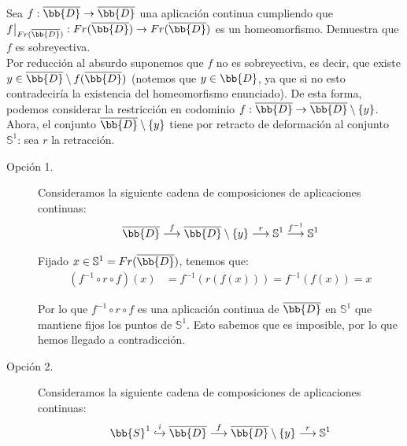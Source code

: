 \documentclass[12pt]{article}
\begin{document}
    \begin{ejercicio} %
        Sea $f:\overline{\bb{D}}\to \overline{\bb{D}}$ una aplicación continua cumpliendo que $f\big|_{Fr(\overline{\bb{D}})}:Fr(\overline{\bb{D}})\to Fr(\overline{\bb{D}})$ es un homeomorfismo. Demuestra que $f$ es sobreyectiva.\\

        \noindent
        Por reducción al absurdo suponemos que $f$ no es sobreyectiva, es decir, que existe $y\in \overline{\bb{D}}\setminus f(\overline{\bb{D}})$ (notemos que $y\in \bb{D}$, ya que si no esto contradeciría la existencia del homeomorfismo enunciado). De esta forma, podemos considerar la restricción en codominio $f:\overline{\bb{D}}\to \overline{\bb{D}}\setminus \{y\}$. Ahora, el conjunto $\overline{\bb{D}}\setminus \{y\}$ tiene por retracto de deformación al conjunto $\mathbb{S}^1$: sea $r$ la retracción.
        \begin{description}
            \item[Opción 1.] Consideramos la siguiente cadena de composiciones de aplicaciones continuas:
            \begin{equation*}
                \overline{\bb{D}} \stackrel{f}{\longrightarrow} \overline{\bb{D}}\setminus \{y\}   \stackrel{r}{\longrightarrow}\mathbb{S}^1 \stackrel{f^{-1}}{\longrightarrow} \mathbb{S}^1
            \end{equation*}

            Fijado $x\in \mathbb{S}^1=Fr(\overline{\bb{D}})$, tenemos que:
            \begin{align*}
                (f^{-1}\circ r\circ f)(x) &= f^{-1}(r(f(x)))
                = f^{-1}(f(x))
                = x
            \end{align*}

            Por lo que $f^{-1}\circ r\circ f$ es una aplicación continua de $\overline{\bb{D}}$ en $\mathbb{S}^1$ que mantiene fijos los puntos de $\mathbb{S}^1$. Esto sabemos que es imposible, por lo que hemos llegado a contradicción.

            \item[Opción 2.] Consideramos la siguiente cadena de composiciones de aplicaciones continuas:
            \begin{equation*}
                \bb{S}^1 \stackrel{i}{\hookrightarrow} \overline{\bb{D}} \stackrel{f}{\longrightarrow} \overline{\bb{D}}\setminus \{y\}   \stackrel{r}{\longrightarrow}\mathbb{S}^1
            \end{equation*}


\end{description}
\end{ejercicio}
\end{document}
